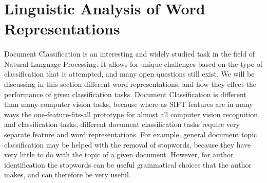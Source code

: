 \documentclass[paper=a4, fontsize=11pt]{scrartcl} %
\begin{document}

\section{Linguistic Analysis of Word Representations}

\paragraph{}
Document Classification is an interesting and widely studied task in the field of Natural Language Processing.  
It allows for unique challenges based on the type of classification that is attempted, and many open questions still exist.   
We will be discussing in this section different word representations, and how they effect the performance of given classification tasks.  
Document Classification is different than many computer vision tasks, because where as SIFT features are in many ways the one-feature-fits-all prototype for almost all computer vision recognition and classification tasks, different document classification tasks require very separate feature and word representations.  
For example, general document topic classification may be helped with the removal of stopwords, because they have very little to do with the topic of a given document.  
However, for author identification the stopwords can be useful grammatical choices that the author makes, and can therefore be very useful.  
\end{document}

